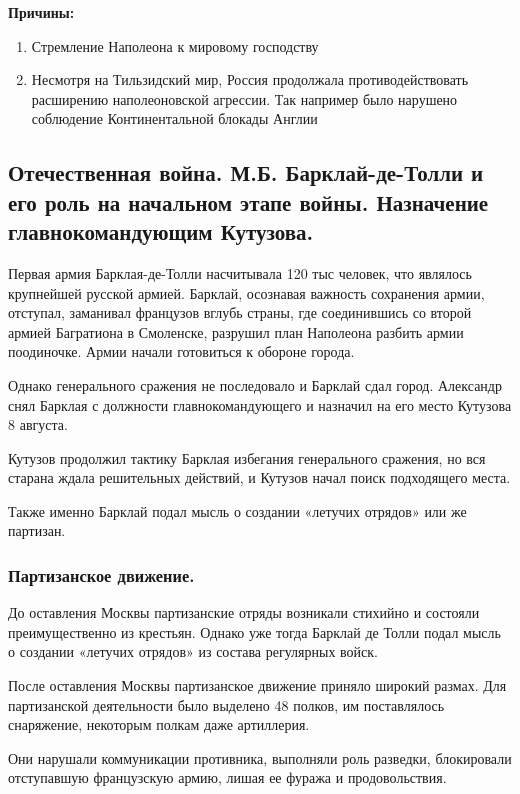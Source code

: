 \textbf{Причины:}

\begin{enumerate}
    \item{ Стремление Наполеона к мировому господству }
    \item{ Несмотря на Тильзидский мир, Россия продолжала противодействовать расширению наполеоновской агрессии. Так например было нарушено соблюдение Континентальной блокады Англии }
\end{enumerate}

\subsection{Отечественная война. М.Б. Барклай-де-Толли и его роль на начальном этапе войны. Назначение главнокомандующим Кутузова.}

Первая армия Барклая-де-Толли насчитывала 120 тыс человек, что являлось крупнейшей русской армией. Барклай, осознавая важность сохранения армии, отступал, заманивал французов вглубь страны, где соединившись со второй армией Багратиона в Смоленске, разрушил план Наполеона разбить армии поодиночке. Армии начали готовиться к обороне города.

Однако генерального сражения не последовало и Барклай сдал город. Александр снял Барклая с должности главнокомандующего и назначил на его место Кутузова 8 августа. 

Кутузов продолжил тактику Барклая избегания генерального сражения, но вся старана ждала решительных действий, и Кутузов начал поиск подходящего места.

Также именно Барклай подал мысль о создании «летучих отрядов» или же партизан.

\subsubsection{Партизанское движение.}

До оставления Москвы партизанские отряды возникали стихийно и состояли преимущественно из крестьян. Однако уже тогда Барклай де Толли подал мысль о создании «летучих отрядов» из состава регулярных войск.

После оставления Москвы партизанское движение приняло широкий размах. Для партизанской деятельности было выделено 48 полков, им поставлялось снаряжение, некоторым полкам даже артиллерия.

Они нарушали коммуникации противника, выполняли роль разведки, блокировали отступавшую французскую армию, лишая ее фуража и продовольствия.


